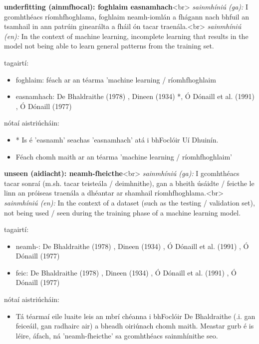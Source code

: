 \documentclass{article}
\begin{document}
\textbf{underfitting (ainmfhocal): foghlaim easnamhach}<br>
\textit{sainmhíniú (ga):} I gcomhthéacs ríomhfhoghlama, foghlaim neamh-iomlán a fhágann nach bhfuil an tsamhail in ann patrúin ginearálta a fháil ón tacar traenála.<br>
\textit{sainmhíniú (en):} In the context of machine learning, incomplete learning that results in the model not being able to learn general patterns from the training set.

tagairtí:
\begin{itemize}
	\item foghlaim: féach ar an téarma 'machine learning / ríomhfhoghlaim
	\item easnamhach: De Bhaldraithe (1978) \cite{de-bhaldraithe}, Dineen (1934) \cite{dineen}*, Ó Dónaill et al. (1991) \cite{focloir-beag}, Ó Dónaill (1977) \cite{odonaill}
\end{itemize}

nótaí aistriúcháin:
\begin{itemize}
	\item * Is é 'easnamh' seachas 'easnamhach' atá i bhFoclóir Uí Dhuinín.
	\item Féach chomh maith ar an téarma 'machine learning / ríomhfhoghlaim'
\end{itemize}


\textbf{unseen (aidiacht): neamh-fheicthe}<br>
\textit{sainmhíniú (ga):} I gcomhthéacs tacar sonraí (m.sh. tacar teisteála / deimhnithe), gan a bheith úsáidte / feicthe le linn an próiseas traenála a dhéantar ar shamhail ríomhfhoghlama.<br>
\textit{sainmhíniú (en):} In the context of a dataset (such as the testing / validation set), not being used / seen during the training phase of a machine learning model.

tagairtí:
\begin{itemize}
	\item neamh-: De Bhaldraithe (1978) \cite{de-bhaldraithe}, Dineen (1934) \cite{dineen}, Ó Dónaill et al. (1991) \cite{focloir-beag}, Ó Dónaill (1977) \cite{odonaill}
	\item feic: De Bhaldraithe (1978) \cite{de-bhaldraithe}, Dineen (1934) \cite{dineen}, Ó Dónaill et al. (1991) \cite{focloir-beag}, Ó Dónaill (1977) \cite{odonaill}
\end{itemize}

nótaí aistriúcháin:
\begin{itemize}
	\item Tá téarmaí eile luaite leis an mbrí chéanna i bhFoclóir De Bhaldraithe (.i. gan feiceáil, gan radhairc air) a bheadh oiriúnach chomh maith. Meastar gurb é is léire, áfach, ná 'neamh-fheicthe' sa gcomhthéacs sainmhínithe seo.
\end{itemize}
\end{document}
